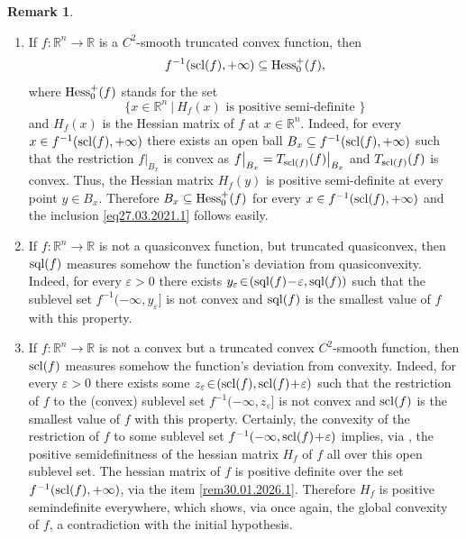 \documentclass[12pt,twoside,reqno]{amsart}
\theoremstyle{definition}
\newtheorem{remark}{Remark}[section]
\numberwithin{equation}{section}
\begin{document}
\begin{remark}
\begin{enumerate}
\[{\rm Hess}^+(f):=\{x\in\mathbb{R}^n \ | \ H_f(x)\mbox{ is positive definite }\}\] and 
\[
h_{\max}(f):=\max\left(f\big|_{\mathbb{R}^n\setminus {\rm Hess}^+(f)}\right).
\]
Indeed, otherwise $f^{-1}(q)\cap\left(\mathbb{R}^n\setminus {\rm Hess}^+(f)\right)\neq\emptyset$
for some $q>h_{\max}(f)$. If $x\in f^{-1}(q)\cap\left(\mathbb{R}^n\setminus {\rm Hess}^+(f)\right)$, i.e. $f(x)=q$ and $x\in \mathbb{R}^n\setminus {\rm Hess}^+(f)$, then 
\[q=f(x)\leq h_{\max}(f)=\max\left(f\big|_{\mathbb{R}^n\setminus {\rm Hess}^+(f)}\right)<q,\] which is absurd.
 \item \label{rem30.01.2026.1}
If $f:\mathbb{R}^n\longrightarrow\mathbb{R}$ is a $C^2$-smooth truncated convex function, then 
\begin{equation}\label{eq27.03.2021.1}
f^{-1}({\rm scl}(f),+\infty)\subseteq{\rm Hess}^+_0(f),\end{equation} 
where ${\rm Hess}^+_0(f)$ stands for the set 
\[\{x\in\mathbb{R}^n \ | \ H_f(x)\mbox{ is positive semi-definite }\}\]
and $H_f(x)$ is the Hessian matrix of $f$ at $x\in\mathbb{R}^n$.
Indeed, for every $x\in f^{-1}({\rm scl}(f),+\infty)$ there exists an open ball $B_x\subseteq f^{-1}({\rm scl}(f),+\infty)$ such that the restriction 
$f\big|_{B_x}$ is convex as $f\big|_{B_x}=T_{{\rm scl}(f)}(f)\big|_{B_x}$ and $T_{{\rm scl}(f)}(f)$ is convex. Thus, the 
Hessian matrix $H_f(y)$ is positive semi-definite at every point $y\in B_x$. Therefore $B_x\subseteq {\rm Hess}^+_0(f)$ for every $x\in f^{-1}({\rm scl}(f),+\infty)$
and the inclusion \eqref{eq27.03.2021.1} follows easily.
 \item If $f:\mathbb{R}^n\longrightarrow\mathbb{R}$ is not a quasiconvex function, but truncated quasiconvex, then ${\rm sql}(f)$ measures somehow the function's deviation from quasiconvexity. Indeed, for every $\varepsilon>0$ there exists 
$y_{\varepsilon}\!\in\!({\rm sql}(f)\!-\!\varepsilon,{\rm sql}(f))$ such that the sublevel set $f^{-1}(-\infty,y_\varepsilon]$ is not convex and ${\rm sql}(f)$ is the smallest value of $f$ with this property. 
\item If $f:\mathbb{R}^n\longrightarrow\mathbb{R}$ is not a convex but a truncated convex $C^2$-smooth function, then ${\rm scl}(f)$ measures somehow the function's deviation from convexity. Indeed, 
for every $\varepsilon>0$ there exists some $z_{\varepsilon}\!\in\!({\rm scl}(f),{\rm scl}(f)\!+\!\varepsilon)$ such that the restriction of  $f$ to the (convex) sublevel set $f^{-1}(-\infty,z_\varepsilon]$ is not convex and ${\rm scl}(f)$ is the smallest value 
of $f$ with this property.  Certainly, the convexity of the restriction of $f$ to some sublevel set $f^{-1}(-\infty,{\rm scl}(f)\!+\!\varepsilon)$ implies, via \cite[Theorem 4.3.1(i)]{Uruty-Lemarechal}, the positive semidefinitness of the hessian matrix $H_f$ of $f$ all over this open sublevel set. The hessian matrix of $f$ is positive definite over the set $f^{-1}({\rm scl}(f),+\infty)$, via the item \eqref{rem30.01.2026.1}. Therefore $H_f$ is positive semindefinite everywhere, which shows, via \cite[Theorem 4.3.1(i)]{Uruty-Lemarechal} once again, the global convexity of $f$, a contradiction with the initial hypothesis.\label{rem30.01.2026.3}
\end{enumerate}\label{rem30.01.2026.2}
\end{remark}
\end{document}
